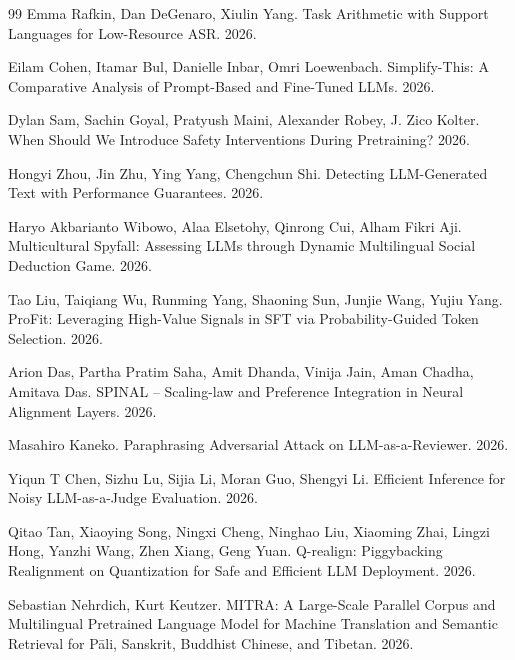 \documentclass{article}
\begin{document}
\begin{thebibliography}{99}
Emma Rafkin, Dan DeGenaro, Xiulin Yang. Task Arithmetic with Support Languages for Low-Resource ASR. 2026.

Eilam Cohen, Itamar Bul, Danielle Inbar, Omri Loewenbach. Simplify-This: A Comparative Analysis of Prompt-Based and Fine-Tuned LLMs. 2026.

Dylan Sam, Sachin Goyal, Pratyush Maini, Alexander Robey, J. Zico Kolter. When Should We Introduce Safety Interventions During Pretraining? 2026.

Hongyi Zhou, Jin Zhu, Ying Yang, Chengchun Shi. Detecting LLM-Generated Text with Performance Guarantees. 2026.

Haryo Akbarianto Wibowo, Alaa Elsetohy, Qinrong Cui, Alham Fikri Aji. Multicultural Spyfall: Assessing LLMs through Dynamic Multilingual Social Deduction Game. 2026.

Tao Liu, Taiqiang Wu, Runming Yang, Shaoning Sun, Junjie Wang, Yujiu Yang. ProFit: Leveraging High-Value Signals in SFT via Probability-Guided Token Selection. 2026.

Arion Das, Partha Pratim Saha, Amit Dhanda, Vinija Jain, Aman Chadha, Amitava Das. SPINAL -- Scaling-law and Preference Integration in Neural Alignment Layers. 2026.

Masahiro Kaneko. Paraphrasing Adversarial Attack on LLM-as-a-Reviewer. 2026.

Yiqun T Chen, Sizhu Lu, Sijia Li, Moran Guo, Shengyi Li. Efficient Inference for Noisy LLM-as-a-Judge Evaluation. 2026.

Qitao Tan, Xiaoying Song, Ningxi Cheng, Ninghao Liu, Xiaoming Zhai, Lingzi Hong, Yanzhi Wang, Zhen Xiang, Geng Yuan. Q-realign: Piggybacking Realignment on Quantization for Safe and Efficient LLM Deployment. 2026.

Sebastian Nehrdich, Kurt Keutzer. MITRA: A Large-Scale Parallel Corpus and Multilingual Pretrained Language Model for Machine Translation and Semantic Retrieval for Pāli, Sanskrit, Buddhist Chinese, and Tibetan. 2026.


\end{thebibliography}
\end{document}
